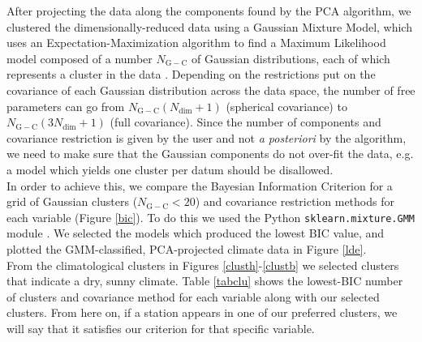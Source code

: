 \documentclass[a4paper,fleqn,usenatbib]{mnras}
\begin{document}
After projecting the data along the components found by the PCA algorithm, we clustered the dimensionally-reduced data using a Gaussian Mixture Model, which uses an Expectation-Maximization algorithm to find a Maximum Likelihood model composed of a number $N_\mathrm{G-C}$ of Gaussian distributions, each of which represents a cluster in the data \citep{gmm}. Depending on the restrictions put on the covariance of each Gaussian distribution across the data space, the number of free parameters can go from $N_\mathrm{G-C}(N_\mathrm{dim}+1)$ (spherical covariance) to  $N_\mathrm{G-C}(3N_\mathrm{dim}+1)$ (full covariance). Since the number of components and covariance restriction is given by the user and not \emph{a posteriori} by the algorithm, we need to make sure that the Gaussian components do not over-fit the data, e.g. a model which yields one cluster per datum should be disallowed.\\

In order to achieve this, we compare the Bayesian Information Criterion \citep{bicref} for a grid of Gaussian clusters ($N_\mathrm{G-C}<20$) and covariance restriction methods for each variable (Figure \ref{bic}). To do this we used the Python \texttt{sklearn.mixture.GMM} module \citep{sklearn}. We selected the models which produced the lowest BIC value, and plotted the GMM-classified, PCA-projected climate data in Figure \ref{lde}. \\

From the climatological clusters in Figures \ref{clusth}-\ref{clustb} we selected clusters that indicate a dry, sunny climate. Table \ref{tabclu} shows the lowest-BIC number of clusters and covariance method for each variable along with our selected clusters. From here on, if a station appears in one of our preferred clusters, we will say that it satisfies our criterion for that specific variable.\\
\end{document}
